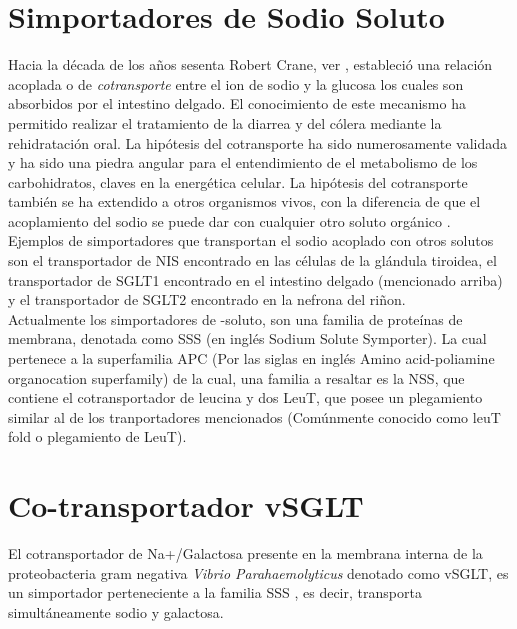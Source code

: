 \section{Simportadores de Sodio Soluto}
Hacia la d\'{e}cada de los a\~{n}os sesenta Robert Crane, ver \cite{Hamilton2013}, estableci\'{o} una relaci\'{o}n acoplada o de \textit{cotransporte} entre el ion de sodio y la glucosa los cuales son absorbidos por el intestino delgado. El conocimiento de este mecanismo ha permitido realizar el tratamiento de la diarrea y del c\'{o}lera mediante la rehidrataci\'{o}n oral. La hip\'{o}tesis del cotransporte ha sido numerosamente validada y ha sido una piedra angular para el entendimiento de el metabolismo de los carbohidratos, claves en la energ\'{e}tica celular. La hip\'{o}tesis del cotransporte tambi\'{e}n se ha extendido a otros organismos vivos, con la diferencia de que el acoplamiento del sodio se puede dar con cualquier otro soluto org\'{a}nico \cite{Faham2008}.\\

Ejemplos de simportadores que transportan el sodio acoplado con otros solutos son el transportador de  NIS encontrado en las c\'{e}lulas de la gl\'{a}ndula tiroidea, el transportador de   SGLT1 encontrado en el intestino delgado (mencionado arriba) y el transportador de   SGLT2 encontrado en la nefrona del ri\~{n}on.\\ 

Actualmente los simportadores de -soluto, son una familia de prote\'{i}nas de membrana, denotada como SSS (en ingl\'{e}s Sodium Solute Symporter). La cual pertenece a la superfamilia APC (Por las siglas en ingl\'{e}s Amino acid-poliamine organocation superfamily) de la cual, una familia a resaltar es la NSS, que contiene el cotransportador de leucina y dos  LeuT, que posee un plegamiento similar al de los tranportadores mencionados (Com\'{u}nmente conocido como leuT fold o plegamiento de LeuT).\\
\section{Co-transportador vSGLT}
El cotransportador de Na+/Galactosa presente en la membrana interna de la proteobacteria gram negativa \textit{Vibrio Parahaemolyticus} denotado como vSGLT, es un simportador perteneciente a la familia  SSS \cite{SaierJr.}, es decir, transporta simult\'{a}neamente sodio y galactosa.\\

